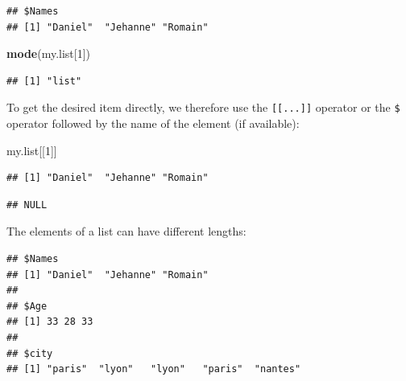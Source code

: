 \documentclass[]{book}
\newenvironment{Shaded}{\begin{snugshade}}{\end{snugshade}}
\newcommand{\DecValTok}[1]{\textcolor[rgb]{0.00,0.00,0.81}{#1}}
\newcommand{\KeywordTok}[1]{\textcolor[rgb]{0.13,0.29,0.53}{\textbf{#1}}}
\newcommand{\NormalTok}[1]{#1}
\newcommand{\OperatorTok}[1]{\textcolor[rgb]{0.81,0.36,0.00}{\textbf{#1}}}
\newcommand{\StringTok}[1]{\textcolor[rgb]{0.31,0.60,0.02}{#1}}
\begin{document}
\begin{verbatim}
## $Names
## [1] "Daniel"  "Jehanne" "Romain"
\end{verbatim}

\begin{Shaded}
\begin{Highlighting}[]
\KeywordTok{mode}\NormalTok{(my.list[}\DecValTok{1}\NormalTok{])}
\end{Highlighting}
\end{Shaded}

\begin{verbatim}
## [1] "list"
\end{verbatim}

To get the desired item directly, we therefore use the \texttt{{[}{[}...{]}{]}} operator or the \texttt{\$} operator followed by the name of the element (if available):

\begin{Shaded}
\begin{Highlighting}[]
\NormalTok{my.list[[}\DecValTok{1}\NormalTok{]]}
\end{Highlighting}
\end{Shaded}

\begin{verbatim}
## [1] "Daniel"  "Jehanne" "Romain"
\end{verbatim}

\begin{Shaded}
\end{Shaded}

\begin{verbatim}
## NULL
\end{verbatim}

The elements of a list can have different lengths:

\begin{Shaded}
\end{Shaded}

\begin{verbatim}
## $Names
## [1] "Daniel"  "Jehanne" "Romain" 
## 
## $Age
## [1] 33 28 33
## 
## $city
## [1] "paris"  "lyon"   "lyon"   "paris"  "nantes"
\end{verbatim}
\end{document}
